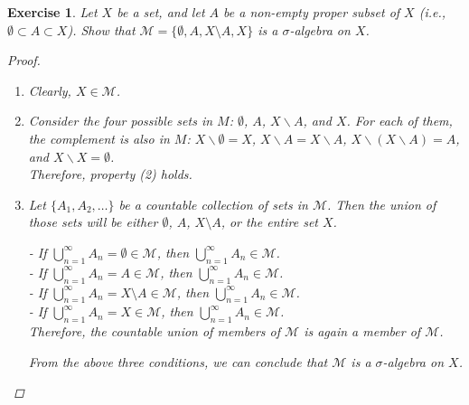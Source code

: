 \documentclass{article}
\newtheorem{exercise}{Exercise}
\begin{document}
    \begin{exercise}
        Let $X$ be a set, and let $A$ be a non-empty proper subset of $X$ (i.e., $\emptyset \subset A \subset X$). Show that $\mathcal{M} = \{\emptyset, A, X \setminus A, X\}$ is a $\sigma$-algebra on $X$.

    \begin{proof}
    \begin{enumerate}
    \item  Clearly, $X \in \mathcal{M}$.
    \item Consider the four possible sets in \(M\): \(\emptyset\), \(A\), \(X \backslash A\), and \(X\).
For each of them, the complement is also in \(M\): \(X \backslash \emptyset = X\), \(X \backslash A = X \backslash A\), \(X \backslash (X \backslash A) = A\), and \(X \backslash X = \emptyset\).\\
Therefore, property (2) holds.

    \item Let $\{A_1, A_2, \ldots\}$ be a countable collection of sets in $\mathcal{M}$. Then the union of those sets will be either $\emptyset$, $A$, $X \setminus A$, or the entire set $X$.

- If $\bigcup_{n=1}^\infty A_n = \emptyset \in \mathcal{M}$, then $\bigcup_{n=1}^\infty A_n \in \mathcal{M}$.\\
- If $\bigcup_{n=1}^\infty A_n = A \in \mathcal{M}$, then $\bigcup_{n=1}^\infty A_n \in \mathcal{M}$.\\
- If $\bigcup_{n=1}^\infty A_n = X \setminus A \in \mathcal{M}$, then $\bigcup_{n=1}^\infty A_n \in \mathcal{M}$.\\
- If $\bigcup_{n=1}^\infty A_n = X \in \mathcal{M}$, then $\bigcup_{n=1}^\infty A_n \in \mathcal{M}$.\\

Therefore, the countable union of members of $\mathcal{M}$ is again a member of $\mathcal{M}$.

From the above three conditions, we can conclude that $\mathcal{M}$ is a $\sigma$-algebra on $X$.

\end{enumerate}
    \end{proof}
    \end{exercise}
\end{document}
